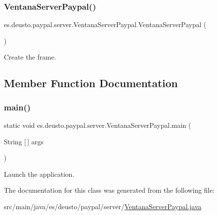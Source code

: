 \subsubsection{\texorpdfstring{VentanaServerPaypal()}{VentanaServerPaypal()}}
{\footnotesize\ttfamily es.\+deusto.\+paypal.\+server.\+Ventana\+Server\+Paypal.\+Ventana\+Server\+Paypal (\begin{DoxyParamCaption}{ }\end{DoxyParamCaption})}

Create the frame. 

\subsection{Member Function Documentation}
\mbox{\label{classes_1_1deusto_1_1paypal_1_1server_1_1_ventana_server_paypal_ae060e72a63cc631513f054ceb6321a4f}} 
\subsubsection{\texorpdfstring{main()}{main()}}
{\footnotesize\ttfamily static void es.\+deusto.\+paypal.\+server.\+Ventana\+Server\+Paypal.\+main (\begin{DoxyParamCaption}\item[{String \mbox{[}$\,$\mbox{]}}]{args }\end{DoxyParamCaption})\hspace{0.3cm}{\ttfamily [static]}}

Launch the application. 

The documentation for this class was generated from the following file\+:\begin{DoxyCompactItemize}
\item 
src/main/java/es/deusto/paypal/server/\mbox{\hyperlink{_ventana_server_paypal_8java}{Ventana\+Server\+Paypal.\+java}}\end{DoxyCompactItemize}
